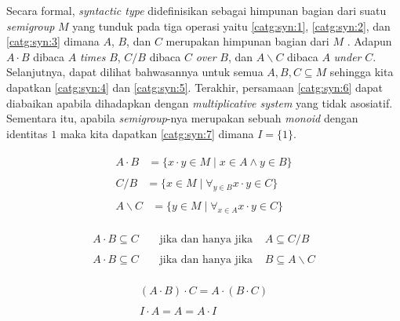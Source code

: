Secara formal, \textit{syntactic type} didefinisikan sebagai himpunan bagian dari suatu
\textit{semigroup} $M$ yang tunduk pada tiga operasi yaitu \ref{catg:syn:1},
\ref{catg:syn:2}, dan \ref{catg:syn:3} dimana $A$, $B$, dan $C$ merupakan himpunan bagian dari $M$
\citep{Lambek1988}. Adapun $A \cdot B$ dibaca $A$ \textit{times} $B$, $C/B$ dibaca $C$ \textit{over}
$B$, dan $A\backslash{}C$ dibaca $A$ \textit{under} $C$. Selanjutnya, dapat dilihat bahwasannya
untuk semua $A, B, C \subseteq M$ sehingga kita dapatkan \ref{catg:syn:4} dan \ref{catg:syn:5}.
Terakhir, persamaan \ref{catg:syn:6} dapat diabaikan apabila dihadapkan dengan
\textit{multiplicative system} yang tidak asosiatif. Sementara itu, apabila \textit{semigroup}-nya
merupakan sebuah \textit{monoid} dengan identitas $1$ maka kita dapatkan \ref{catg:syn:7} dimana
$I = \{1\}$.

\begin{align}
  \begin{split}\label{catg:syn:1}
    A \cdot B & = \{x \cdot y \in M \mid x \in A \land y \in B\}
  \end{split}\\
  \begin{split}\label{catg:syn:2}
    C/B & = \{x \in M \mid \forall_{y \in B} x \cdot y \in C\}
  \end{split}\\
  \begin{split}\label{catg:syn:3}
    A\backslash{}C & = \{y \in M \mid \forall_{x \in A} x \cdot y \in C\}
  \end{split}
\end{align}

\begin{align}
  \begin{split}\label{catg:syn:4}
    A \cdot B \subseteq C & \;\;\;\;\text{jika dan hanya jika}\;\;\;\; A \subseteq C/B
  \end{split}\\
  \begin{split}\label{catg:syn:5}
    A \cdot B \subseteq C & \;\;\;\;\text{jika dan hanya jika}\;\;\;\; B \subseteq A\backslash{}C
  \end{split}
\end{align}

\begin{align}
  \begin{split}\label{catg:syn:6}
    (A \cdot B) \cdot C = A \cdot (B \cdot C)
  \end{split}\\
  \begin{split}\label{catg:syn:7}
    I \cdot A = A = A \cdot I
  \end{split}
\end{align}

